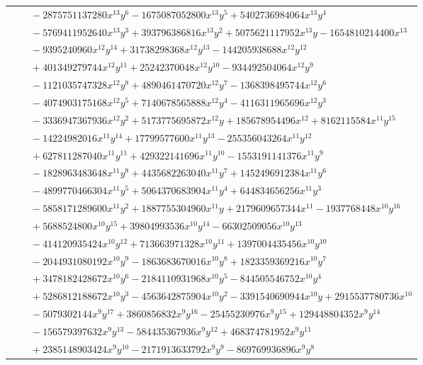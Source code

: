 \documentclass[11pt]{article}
\begin{document}
\begin{longtable}{@{}ll@{}}
 & $\quad -2875751137280x^{13}y^{6}-1675087052800x^{13}y^{5}+5402736984064x^{13}y^{4}$\\
 & $\quad -5769411952640x^{13}y^{3}+393796386816x^{13}y^{2}+5075621117952x^{13}y-1654810214400x^{13}$\\
 & $\quad -9395240960x^{12}y^{14}+31738298368x^{12}y^{13}-144205938688x^{12}y^{12}$\\
 & $\quad +401349279744x^{12}y^{11}+25242370048x^{12}y^{10}-934492504064x^{12}y^{9}$\\
 & $\quad -1121035747328x^{12}y^{8}+4890461470720x^{12}y^{7}-1368398495744x^{12}y^{6}$\\
 & $\quad -4074903175168x^{12}y^{5}+7140678565888x^{12}y^{4}-4116311965696x^{12}y^{3}$\\
 & $\quad -3336947367936x^{12}y^{2}+5173775695872x^{12}y+185678954496x^{12}+8162115584x^{11}y^{15}$\\
 & $\quad -14224982016x^{11}y^{14}+17799577600x^{11}y^{13}-255356043264x^{11}y^{12}$\\
 & $\quad +627811287040x^{11}y^{11}+429322141696x^{11}y^{10}-1553191141376x^{11}y^{9}$\\
 & $\quad -1828963483648x^{11}y^{8}+4435682263040x^{11}y^{7}+1452496912384x^{11}y^{6}$\\
 & $\quad -4899770466304x^{11}y^{5}+5064370683904x^{11}y^{4}+644834656256x^{11}y^{3}$\\
 & $\quad -5858171289600x^{11}y^{2}+1887755304960x^{11}y+2179609657344x^{11}-1937768448x^{10}y^{16}$\\
 & $\quad +5688524800x^{10}y^{15}+39804993536x^{10}y^{14}-66302509056x^{10}y^{13}$\\
 & $\quad -414120935424x^{10}y^{12}+713663971328x^{10}y^{11}+1397004435456x^{10}y^{10}$\\
 & $\quad -2044931080192x^{10}y^{9}-1863683670016x^{10}y^{8}+1823359369216x^{10}y^{7}$\\
 & $\quad +3478182428672x^{10}y^{6}-2184110931968x^{10}y^{5}-844505546752x^{10}y^{4}$\\
 & $\quad +5286812188672x^{10}y^{3}-4563642875904x^{10}y^{2}-3391540690944x^{10}y+2915537780736x^{10}$\\
 & $\quad -5079302144x^{9}y^{17}+3860856832x^{9}y^{16}-25455230976x^{9}y^{15}+129448804352x^{9}y^{14}$\\
 & $\quad -156579397632x^{9}y^{13}-584435367936x^{9}y^{12}+468374781952x^{9}y^{11}$\\
 & $\quad +2385148903424x^{9}y^{10}-2171913633792x^{9}y^{9}-869769936896x^{9}y^{8}$\\

\end{longtable}
\end{document}

